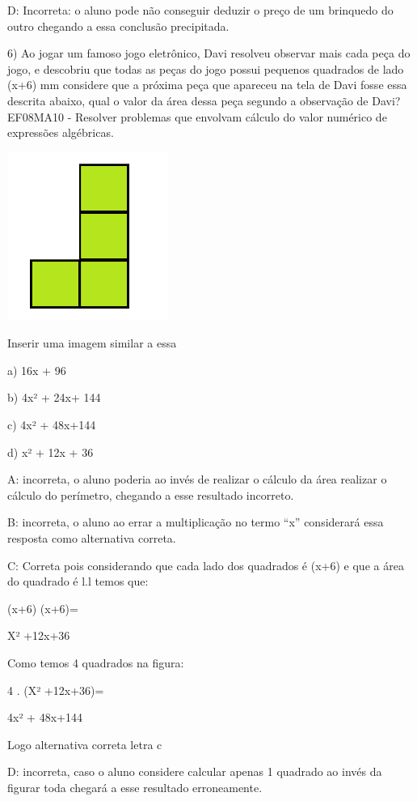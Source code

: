 {D: Incorreta: o aluno pode não conseguir deduzir o preço de um brinquedo
do outro chegando a essa conclusão precipitada.

6) Ao jogar um famoso jogo eletrônico, Davi resolveu observar mais cada
peça do jogo, e descobriu que todas as peças do jogo possui pequenos
quadrados de lado (x+6) mm considere que a próxima peça que apareceu na
tela de Davi fosse essa descrita abaixo, qual o valor da área dessa peça
segundo a observação de Davi? EF08MA10 - Resolver problemas que envolvam
cálculo do valor numérico de expressões algébricas.

\includegraphics[width=2.05833in,height=2.16573in]{./imgSAEB_8_MAT/media/image57.png}

Inserir uma imagem similar a essa

a) 16x + 96

b) 4x² + 24x+ 144

c) 4x² + 48x+144

d) x² + 12x + 36

A: incorreta, o aluno poderia ao invés de realizar o cálculo da área
realizar o cálculo do perímetro, chegando a esse resultado incorreto.

B: incorreta, o aluno ao errar a multiplicação no termo ``x''
considerará essa resposta como alternativa correta.

C: Correta pois considerando que cada lado dos quadrados é (x+6) e que a
área do quadrado é l.l temos que:

(x+6) (x+6)=

X² +12x+36

Como temos 4 quadrados na figura:

4 . (X² +12x+36)=

4x² + 48x+144

Logo alternativa correta letra c

D: incorreta, caso o aluno considere calcular apenas 1 quadrado ao invés
da figurar toda chegará a esse resultado erroneamente.

}
